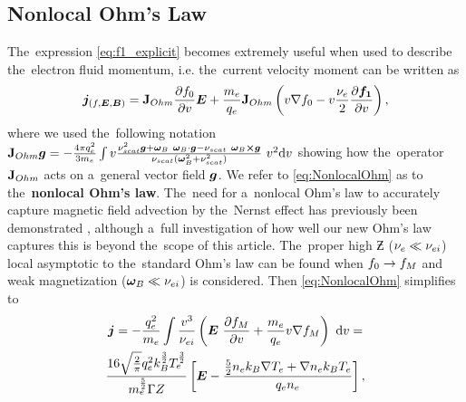 \subsection{Nonlocal Ohm's Law}
\label{sec:Efield}
The~expression \eqref{eq:f1_explicit} becomes extremely useful when used
to describe the~electron fluid momentum, i.e. the~current velocity moment
can be written as
\begin{equation}
  \boldsymbol{j}_{(f, \boldsymbol{E}, \boldsymbol{B})} = \mathbf{J}_{Ohm}\frac{\partial{f_0}}{\partial{v}}\boldsymbol{E} 
  + \frac{m_e}{q_e} \mathbf{J}_{Ohm}\left(v \nabla f_0 
  - v\frac{\nu_{e}}{2}\frac{\partial{{\boldsymbol{f_1}}}}{\partial{v}} \right)  
  ,
  \label{eq:NonlocalOhm}
\end{equation}
where we used the~following notation 
$\mathbf{J}_{Ohm}\boldsymbol{g} = - \frac{4\pi q_e^2}{3 m_e} \int v \frac{\nu_{scat}^2 \boldsymbol{g} 
  + \boldsymbol{\omega}_{B}~\boldsymbol{\omega}_{B}\cdot\boldsymbol{g} - \nu_{scat}~\boldsymbol{\omega}_{B} \boldsymbol{\times} \boldsymbol{g}}
  {\nu_{scat} (\boldsymbol{\omega}_{B}^2 + \nu_{scat}^2)}~v^2 \text{d} v$ showing 
how the~operator $\mathbf{J}_{Ohm}$
acts on a~general vector field $\boldsymbol{g}$.
We refer to 
\eqref{eq:NonlocalOhm} as to the~{\bf nonlocal Ohm's law}.
The~need for a~nonlocal Ohm's law to accurately capture magnetic field 
advection by the~Nernst effect has previously been demonstrated 
\cite{Luciani85, Ridgers08, Brodrick18}, although a~full investigation 
of how well our new Ohm's law captures this is beyond 
the~scope of this article. 
The~proper high $\Zbar$ ($\nu_{e} \ll \nu_{ei}$) local asymptotic to 
the~standard Ohm's law  
can be found when $f_0\rightarrow f_M$ and weak magnetization 
($\boldsymbol{\omega}_{B} \ll \nu_{ei}$) is considered. Then \eqref{eq:NonlocalOhm} simplifies to
\begin{multline}
  \boldsymbol{j} =- \frac{q_e^2}{m_e} \int \frac{v^3}{\nu_{ei}}
  \left( \boldsymbol{E}~\frac{\partial{f_M}}{\partial{v}} + \frac{m_e}{q_e}v \nabla f_M \right)
  ~\text{d} v =\\
  \frac{16\sqrt{\frac{2}{\pi}}q_e^2 k_B^\frac{3}{2} T_e^\frac{3}{2}}{m_e^\frac{5}{2} \Gamma Z}
  \left[\boldsymbol{E} - \frac{\frac{5}{2} n_e k_B \nabla T_e 
  + \nabla n_e k_B T_e}{q_e n_e}  \right] 
  ,
  \label{eq:AsymptoticOhm}
\end{multline}
